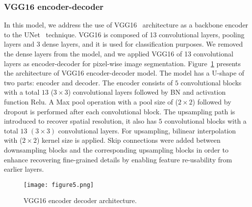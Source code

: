 \subsubsection{VGG16 encoder-decoder}
In this model, we address the use of VGG16~\cite{Simonyan2015} architecture as a backbone encoder to the UNet~\cite{Ronneberger2015} technique.
VGG16 is composed of 13 convolutional layers, pooling layers and \(3\) dense layers, and it is used for classification purposes.
We removed the dense layers from the model, and we applied VGG16 of 13 convolutional layers as encoder-decoder for pixel-wise image segmentation.
Figure~\ref{vgg16} presents the architecture of VGG16 encoder-decoder model. 
The model has a U-shape of two parts: encoder and decoder.
The encoder consists of \(5\) convolutional blocks with a total \(13\)  (\(3\times3\)) convolutional layers followed by BN and activation function Relu.
A Max pool operation with a pool size of (\(2\times2\)) followed by dropout is performed after each convolutional block.  
The upsampling path is introduced to recover spatial resolution, it also has \(5\) convolutional blocks with a total \(13\) \((3\times 3)\) convolutional layers.
For upsampling, bilinear interpolation with (\(2\times2\)) kernel size is applied.
Skip connections were added between downsampling blocks and the corresponding upsampling blocks in order to enhance recovering fine-grained details by enabling feature re-usability from earlier layers.
\begin{figure} [h!]
	\begin{center}
		\texttt{[image: figure5.png]}
	\end{center}
	\caption{VGG16 encoder decoder architecture.} 
	\label{vgg16}
\end{figure}

